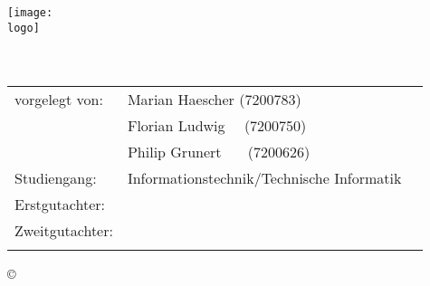 \thispagestyle{empty}
\begin{titlepage}
	\begin{center}

		\texttt{[image: \\logo]}\\[15ex]
		
		\Huge{\textbf{\art}}\\[7ex]
		\Large{\textbf{\titel}}\\[13ex]
				
		\normalsize
		\begin{tabular}{lll}\\
		vorgelegt von:  & \quad Marian Haescher (7200783)\\[1.2ex]
						& \quad Florian Ludwig \ \ (7200750)\\[1.2ex]
						& \quad Philip Grunert \ \ \ (7200626)\\[1.2ex]
		Studiengang: 	& \quad Informationstechnik/Technische Informatik\\[1.2ex]
		Erstgutachter:  & \quad \erstgutachter\\[1.2ex]
		Zweitgutachter: & \quad \zweitgutachterA\\[1.2ex]
						& \quad \zweitgutachterB\\[3ex]
		\end{tabular}
		
		\copyright\ \jahr

	\end{center}
\end{titlepage}